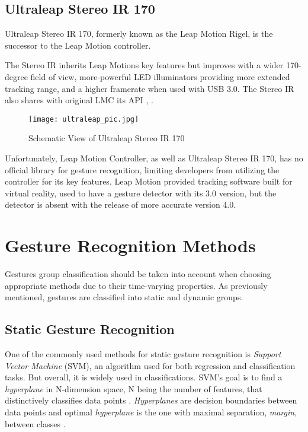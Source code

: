 \subsection{Ultraleap Stereo IR 170}

Ultraleap Stereo IR 170, formerly known as the Leap Motion Rigel, is the successor to the Leap Motion controller.

The Stereo IR inherits Leap Motions key features but improves with a wider 170-degree field of view, more-powerful LED illuminators providing more extended tracking range, and a higher framerate when used with USB 3.0. The Stereo IR also shares with original LMC its API \cite{ultraleap}, \cite{ultraleap2}.

\begin{figure}[H]
	\centering
    \texttt{[image: ultraleap\_pic.jpg]}
	\caption{Schematic View of Ultraleap Stereo IR 170 \cite{ultraleap}}
	\label{fig:UltraLeapscheme}
\end{figure}

Unfortunately, Leap Motion Controller, as well as Ultraleap Stereo IR 170, has no official library for gesture recognition, limiting developers from utilizing the controller for its key features. Leap Motion provided tracking software built for virtual reality, used to have a gesture detector with its 3.0 version, but the detector is absent with the release of more accurate version 4.0.


\section{Gesture Recognition Methods
}

Gestures group classification should be taken into account when choosing appropriate methods due to their time-varying properties. As previously mentioned, gestures are classified into static and dynamic groups. 

\subsection{Static Gesture Recognition}

One of the commonly used methods for static gesture recognition is \textit{Support Vector Machine} (SVM), an algorithm used for both regression and classification tasks. But overall, it is widely used in classifications. SVM's goal is to find a \textit{hyperplane} in N-dimension space, N being the number of features, that distinctively classifies data points \cite{svmIntroToML}. \textit{Hyperplanes} are decision boundaries between data points and optimal \textit{hyperplane} is the one with maximal separation, \textit{margin}, between classes \cite{savaris}.

